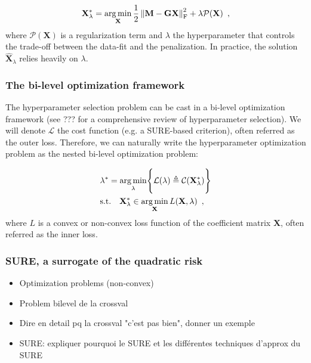 \begin{equation}
    \mathbf{X}_{\lambda}^* = \operatorname*{arg\,min}_{\mathbf{X}}
    \frac{1}{2}\left \lVert \mathbf{M - GX} \right \rVert^2_{\text{F}}
    + \lambda \mathcal{P}(\mathbf{X})
    \enspace ,
\end{equation}
%
where $\mathcal{P}(\mathbf{X})$ is a regularization term and $\lambda$ the hyperparameter
that controls the trade-off between the data-fit and the penalization. In practice, the solution
$\hat{\mathbf{X}}_{\lambda}$ relies heavily on $\lambda$.

\subsubsection{The bi-level optimization framework}

The hyperparameter selection problem can be cast in a bi-level optimization framework (see ???
for a comprehensive review of hyperparameter selection). We will denote $\mathcal{L}$ the cost function
(e.g. a SURE-based criterion), often referred as the outer loss. Therefore, we can naturally write
the hyperparameter optimization problem as the nested bi-level optimization problem:

\begin{align*}
    &\lambda^* = \operatorname*{arg\,min}_{\lambda} 
    \Biggl\{
        \mathcal{L}(\lambda) 
        \triangleq 
        \mathcal{C}(\mathbf{X}_{\lambda}^*)
    \Biggr\} \\
    &\text{s.t.} \quad 
    \mathbf{X}_{\lambda}^* 
    \in 
    \operatorname*{arg\,min}_{\mathbf{X}} L(\mathbf{X}, \lambda)
    \enspace ,
\end{align*}
%
where $L$ is a convex or non-convex loss function of the coefficient matrix $\mathbf{X}$, 
often referred as the inner loss.

\subsubsection{SURE, a surrogate of the quadratic risk}

\begin{itemize}
    \item Optimization problems (non-convex)
    \item Problem bilevel de la crossval
    \item Dire en detail pq la crossval "c'est pas bien", donner un exemple
    \item SURE: expliquer pourquoi le SURE et les différentes techniques d'approx du SURE
\end{itemize}
%
%
%
%
